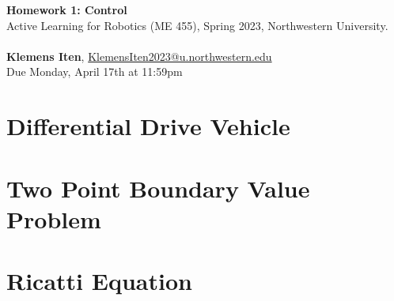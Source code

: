 \documentclass[letterpaper, 12pt]{article}
\begin{document}

\large\textbf{Homework 1: Control} \\  
\normalsize Active Learning for Robotics (ME 455), Spring 2023, Northwestern University.
\\ \\
\normalsize\textbf{Klemens Iten}, \href{mailto:KlemensIten2023@u.northwestern.edu}{KlemensIten2023@u.northwestern.edu}\\
\normalsize   Due Monday, April 17th at 11:59pm

\section{Differential Drive Vehicle}


\clearpage
\section{Two Point Boundary Value Problem}


\clearpage
\section{Ricatti Equation}


% 
% 
\end{document}

